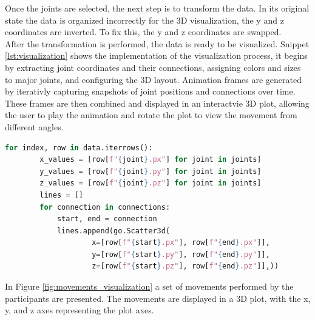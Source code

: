         Once the joints are selected, the next step is to transform the data. In its original state the data is organized incorrectly for the 3D visualization, the y and z coordinates are inverted. To fix this, the y and z coordinates are swapped. \\

        After the transformation is performed, the data is ready to be visualized. Snippet \ref{lst:visualization} shows the implementation of the visualization process, it begins by extracting joint coordinates and their connections, assigning colors and sizes to major joints, and configuring the 3D layout. Animation frames are generated by iterativly capturing snapshots of joint positions and connections over time. These frames are then combined and displayed in an interactvie 3D plot, allowing the user to play the animation and rotate the plot to view the movement from different angles.

        \begin{lstlisting}[caption={Code snippet creates connecting lines between joints using their 3D coordinates, enabling visualization of joint movements.}, label={lst:visualization}, language=Python]            
    for index, row in data.iterrows():
        x_values = [row[f"{joint}.px"] for joint in joints]
        y_values = [row[f"{joint}.py"] for joint in joints]
        z_values = [row[f"{joint}.pz"] for joint in joints]
        lines = []
        for connection in connections:
            start, end = connection
            lines.append(go.Scatter3d(
                    x=[row[f"{start}.px"], row[f"{end}.px"]],
                    y=[row[f"{start}.py"], row[f"{end}.py"]],
                    z=[row[f"{start}.pz"], row[f"{end}.pz"]],))
        \end{lstlisting}
        
        \newpage

        In Figure \ref{fig:movements_visualization} a set of movements performed by the participants are presented. The movements are displayed in a 3D plot, with the x, y, and z axes representing the plot axes. 

